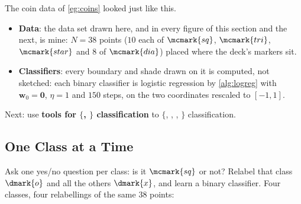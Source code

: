 The coin data of \autoref{eg:coins} looked just like this.
\begin{itemize}
    \item \textbf{Data}: the data set drawn here, and in every figure of this
        section and the next, is mine: \(N = 38\) points (\(10\) each of
        \(\mcmark{sq}\), \(\mcmark{tri}\), \(\mcmark{star}\) and \(8\) of
        \(\mcmark{dia}\)) placed where the deck's markers sit.
    \item \textbf{Classifiers}: every boundary and shade drawn on it is
        computed, not sketched: each binary classifier is logistic regression
        by \autoref{alg:logreg} with \(\bm{w}_0 = \bm{0}\), \(\eta = 1\) and
        \(150\) steps, on the two coordinates rescaled to \([-1, 1]\).
\end{itemize}

\begin{moral}
    Next: use \textcolor{orange!85!black}{\textbf{tools for
    \(\{\), \(\}\) classification}} to \(\{\),
    , , \(\}\) classification.
\end{moral}

\subsection{One Class at a Time}

Ask one yes/no question per class: is it \(\mcmark{sq}\) or not? Relabel that
class \(\dmark{o}\) and all the others \(\dmark{x}\), and learn a binary
classifier. Four classes, four relabellings of the same \(38\) points:

